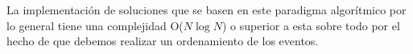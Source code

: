 La implementación de soluciones que se basen en este paradigma algorítmico por lo general tiene una complejidad O($N\log N$) o superior a esta sobre todo por el hecho de que debemos realizar un ordenamiento de los eventos.